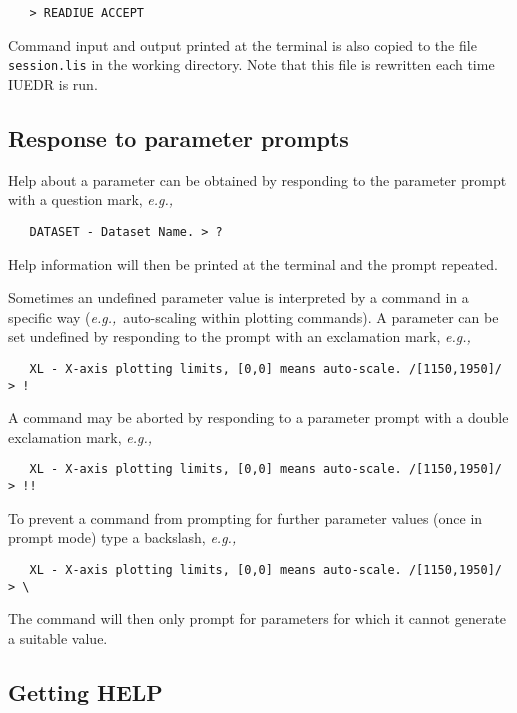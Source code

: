\begin{verbatim}
   > READIUE ACCEPT
\end{verbatim}

Command input and output printed at the terminal is also copied to the
file \verb+session.lis+ in the working directory.
Note that this file is rewritten each time IUEDR is run.

\subsection {Response to parameter prompts}

Help about a parameter can be obtained by responding to the parameter prompt
with a question mark, {\it{e.g.,}}

\begin{verbatim}
   DATASET - Dataset Name. > ?
\end{verbatim}

Help information will then be printed at the terminal and the prompt repeated.

Sometimes an undefined parameter value is interpreted by a command in
a specific way ({\it{e.g.,}}\ auto-scaling within plotting commands)\@.
A parameter can be set undefined by responding to the prompt with an
exclamation mark, {\it{e.g.,}}

\begin{verbatim}
   XL - X-axis plotting limits, [0,0] means auto-scale. /[1150,1950]/ > !
\end{verbatim}

A command may be aborted by responding to a parameter prompt with a
double exclamation mark, {\it{e.g.,}}

\begin{verbatim}
   XL - X-axis plotting limits, [0,0] means auto-scale. /[1150,1950]/ > !!
\end{verbatim}

To prevent a command from prompting for further parameter values (once in
prompt mode) type a backslash, {\it{e.g.,}}

\begin{verbatim}
   XL - X-axis plotting limits, [0,0] means auto-scale. /[1150,1950]/ > \
\end{verbatim}

The command will then only prompt for parameters for which it cannot generate
a suitable value.

\subsection {Getting HELP}

